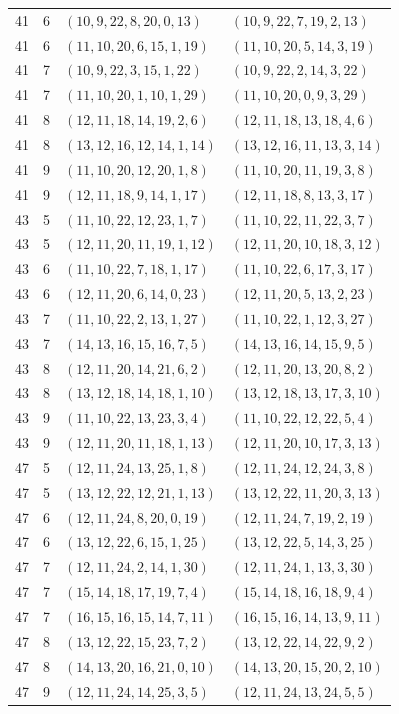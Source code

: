 \begin{longtable}{rrll}
41&6&$(10,9,22,8,20,0,13)$&$(10,9,22,7,19,2,13)$\\
41&6&$(11,10,20,6,15,1,19)$&$(11,10,20,5,14,3,19)$\\
41&7&$(10,9,22,3,15,1,22)$&$(10,9,22,2,14,3,22)$\\
41&7&$(11,10,20,1,10,1,29)$&$(11,10,20,0,9,3,29)$\\
41&8&$(12,11,18,14,19,2,6)$&$(12,11,18,13,18,4,6)$\\
41&8&$(13,12,16,12,14,1,14)$&$(13,12,16,11,13,3,14)$\\
41&9&$(11,10,20,12,20,1,8)$&$(11,10,20,11,19,3,8)$\\
41&9&$(12,11,18,9,14,1,17)$&$(12,11,18,8,13,3,17)$\\
43&5&$(11,10,22,12,23,1,7)$&$(11,10,22,11,22,3,7)$\\
43&5&$(12,11,20,11,19,1,12)$&$(12,11,20,10,18,3,12)$\\
43&6&$(11,10,22,7,18,1,17)$&$(11,10,22,6,17,3,17)$\\
43&6&$(12,11,20,6,14,0,23)$&$(12,11,20,5,13,2,23)$\\
43&7&$(11,10,22,2,13,1,27)$&$(11,10,22,1,12,3,27)$\\
43&7&$(14,13,16,15,16,7,5)$&$(14,13,16,14,15,9,5)$\\
43&8&$(12,11,20,14,21,6,2)$&$(12,11,20,13,20,8,2)$\\
43&8&$(13,12,18,14,18,1,10)$&$(13,12,18,13,17,3,10)$\\
43&9&$(11,10,22,13,23,3,4)$&$(11,10,22,12,22,5,4)$\\
43&9&$(12,11,20,11,18,1,13)$&$(12,11,20,10,17,3,13)$\\
47&5&$(12,11,24,13,25,1,8)$&$(12,11,24,12,24,3,8)$\\
47&5&$(13,12,22,12,21,1,13)$&$(13,12,22,11,20,3,13)$\\
47&6&$(12,11,24,8,20,0,19)$&$(12,11,24,7,19,2,19)$\\
47&6&$(13,12,22,6,15,1,25)$&$(13,12,22,5,14,3,25)$\\
47&7&$(12,11,24,2,14,1,30)$&$(12,11,24,1,13,3,30)$\\
47&7&$(15,14,18,17,19,7,4)$&$(15,14,18,16,18,9,4)$\\
47&7&$(16,15,16,15,14,7,11)$&$(16,15,16,14,13,9,11)$\\
47&8&$(13,12,22,15,23,7,2)$&$(13,12,22,14,22,9,2)$\\
47&8&$(14,13,20,16,21,0,10)$&$(14,13,20,15,20,2,10)$\\
47&9&$(12,11,24,14,25,3,5)$&$(12,11,24,13,24,5,5)$\\

\end{longtable}
